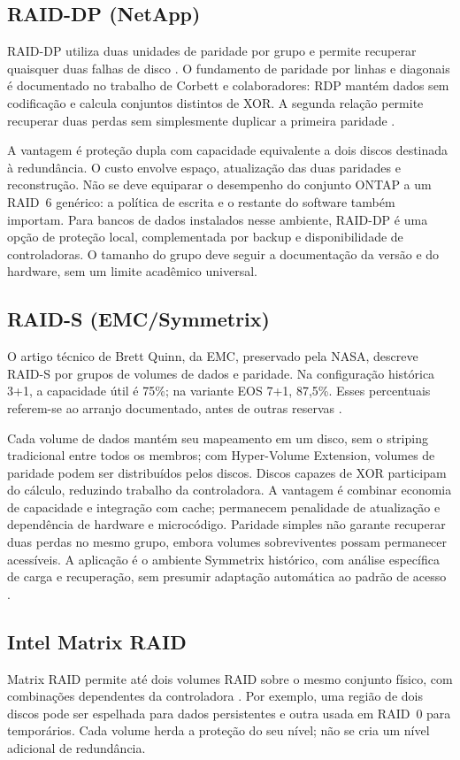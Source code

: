 \documentclass[titlepage]{article}
\begin{document}
\subsection{RAID-DP (NetApp)}
RAID-DP utiliza duas unidades de paridade por grupo e permite recuperar quaisquer duas falhas de disco \cite{netapp_raid_dp}. O fundamento de paridade por linhas e diagonais é documentado no trabalho de Corbett e colaboradores: RDP mantém dados sem codificação e calcula conjuntos distintos de XOR. A segunda relação permite recuperar duas perdas sem simplesmente duplicar a primeira paridade \cite{corbett2004}.

A vantagem é proteção dupla com capacidade equivalente a dois discos destinada à redundância. O custo envolve espaço, atualização das duas paridades e reconstrução. Não se deve equiparar o desempenho do conjunto ONTAP a um RAID~6 genérico: a política de escrita e o restante do software também importam. Para bancos de dados instalados nesse ambiente, RAID-DP é uma opção de proteção local, complementada por backup e disponibilidade de controladoras. O tamanho do grupo deve seguir a documentação da versão e do hardware, sem um limite acadêmico universal.

\subsection{RAID-S (EMC/Symmetrix)}
O artigo técnico de Brett Quinn, da EMC, preservado pela NASA, descreve RAID-S por grupos de volumes de dados e paridade. Na configuração histórica 3+1, a capacidade útil é 75\%; na variante EOS 7+1, 87,5\%. Esses percentuais referem-se ao arranjo documentado, antes de outras reservas \cite{raid_s_nasa}.

Cada volume de dados mantém seu mapeamento em um disco, sem o striping tradicional entre todos os membros; com Hyper-Volume Extension, volumes de paridade podem ser distribuídos pelos discos. Discos capazes de XOR participam do cálculo, reduzindo trabalho da controladora. A vantagem é combinar economia de capacidade e integração com cache; permanecem penalidade de atualização e dependência de hardware e microcódigo. Paridade simples não garante recuperar duas perdas no mesmo grupo, embora volumes sobreviventes possam permanecer acessíveis. A aplicação é o ambiente Symmetrix histórico, com análise específica de carga e recuperação, sem presumir adaptação automática ao padrão de acesso \cite{raid_s_nasa}.

\subsection{Intel Matrix RAID}
Matrix RAID permite até dois volumes RAID sobre o mesmo conjunto físico, com combinações dependentes da controladora \cite{intel_matrix}. Por exemplo, uma região de dois discos pode ser espelhada para dados persistentes e outra usada em RAID~0 para temporários. Cada volume herda a proteção do seu nível; não se cria um nível adicional de redundância.
\end{document}
